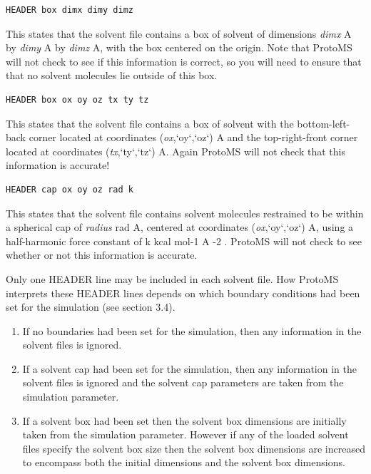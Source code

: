 \documentclass[letterpaper,10pt,english]{sphinxmanual}
\begin{document}
\begin{Verbatim}[commandchars=\\\{\}]
HEADER box dimx dimy dimz
\end{Verbatim}

This states that the solvent file contains a box of solvent of dimensions \emph{dimx} A by \emph{dimy} A by \emph{dimz} A, with the box centered on the origin. Note that ProtoMS will not check to see if this information is correct, so you will need to ensure that that no solvent molecules lie outside of this box.

\begin{Verbatim}[commandchars=\\\{\}]
HEADER box ox oy oz tx ty tz
\end{Verbatim}

This states that the solvent file contains a box of solvent with the bottom-left-back corner located at coordinates (\emph{ox},{}`oy{}`,{}`oz{}`) A and the top-right-front corner located at coordinates (\emph{tx},{}`ty{}`,{}`tz{}`) A. Again ProtoMS will not check that this information is accurate!

\begin{Verbatim}[commandchars=\\\{\}]
HEADER cap ox oy oz rad k
\end{Verbatim}

This states that the solvent file contains solvent molecules restrained to be within a spherical cap of \emph{radius} rad A, centered at coordinates (\emph{ox},{}`oy{}`,{}`oz{}`) A, using a half-harmonic force constant of k kcal mol-1 A -2 . ProtoMS will not check to see whether or not this information is accurate.

Only one HEADER line may be included in each solvent file. How ProtoMS interprets these HEADER lines depends on which boundary conditions had been set for the simulation (see section 3.4).
\begin{enumerate}
\item {} 
If no boundaries had been set for the simulation, then any information in the solvent files is ignored.

\item {} 
If a solvent cap had been set for the simulation, then any information in the solvent files is ignored and the solvent cap parameters are taken from the simulation parameter.

\item {} 
If a solvent box had been set then the solvent box dimensions are initially taken from the simulation parameter. However if any of the loaded solvent files specify the solvent box size then the solvent box dimensions are increased to encompass both the initial dimensions and the solvent box dimensions.

\end{enumerate}
\end{document}
